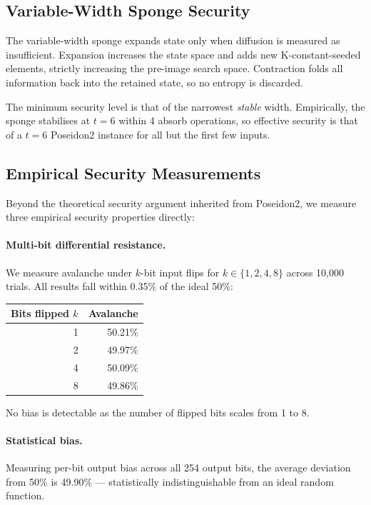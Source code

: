 \documentclass[preprint]{iacrtrans}
\begin{document}
\subsection{Variable-Width Sponge Security}

The variable-width sponge expands state only when diffusion is measured as
insufficient. Expansion increases the state space and adds new K-constant-seeded
elements, strictly increasing the pre-image search space. Contraction folds
all information back into the retained state, so no entropy is discarded.

The minimum security level is that of the narrowest \emph{stable} width.
Empirically, the sponge stabilises at $t=6$ within 4 absorb operations,
so effective security is that of a $t=6$ Poseidon2 instance for all but
the first few inputs.

\subsection{Empirical Security Measurements}
\label{sec:empirical-security}

Beyond the theoretical security argument inherited from Poseidon2, we
measure three empirical security properties directly:

\paragraph{Multi-bit differential resistance.}
We measure avalanche under $k$-bit input flips for $k \in \{1, 2, 4, 8\}$
across 10{,}000 trials. All results fall within 0.35\% of the ideal 50\%:

\begin{center}
\begin{tabular}{rr}
\toprule
Bits flipped $k$ & Avalanche \\
\midrule
1 & 50.21\% \\
2 & 49.97\% \\
4 & 50.09\% \\
8 & 49.86\% \\
\bottomrule
\end{tabular}
\end{center}

No bias is detectable as the number of flipped bits scales from 1 to 8.

\paragraph{Statistical bias.}
Measuring per-bit output bias across all 254 output bits, the average
deviation from 50\% is 49.90\% — statistically indistinguishable from
an ideal random function.
\end{document}
